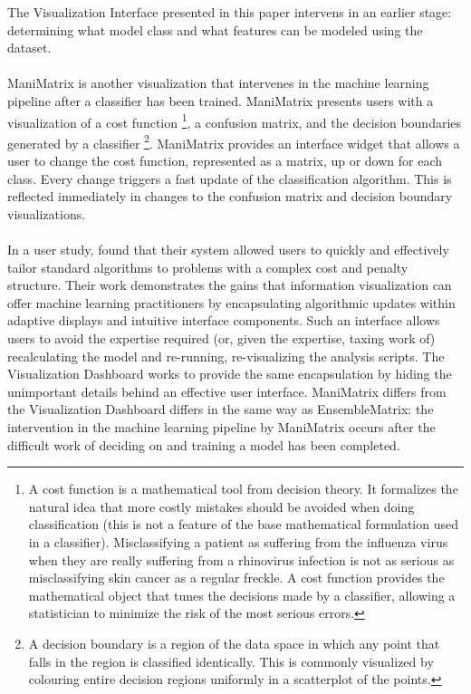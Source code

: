 \documentclass{sigchi}
\begin{document}
%
The Visualization Interface presented in this paper intervens in an earlier stage: determining what model class and what features can be modeled using the dataset. %
%
\\\\
%
ManiMatrix \cite{kapoor2010interactive} is another visualization that intervenes in the machine learning pipeline after a classifier has been trained. %
%
ManiMatrix presents users with a visualization of a cost function
%
\footnote{A cost function is a mathematical tool from decision theory. It formalizes the natural idea that more costly mistakes should be avoided when doing classification (this is not a feature of the base mathematical formulation used in a classifier). %
%
Misclassifying a patient as suffering from the influenza virus when they are really suffering from a rhinovirus infection is not as serious as misclassifying skin cancer as a regular freckle. %
%
A cost function provides the mathematical object that tunes the decisions made by a classifier, allowing a statistician to minimize the risk of the most serious errors.}, a confusion matrix, and the decision boundaries generated by a classifier%
%
\footnote{A decision boundary is a region of the data space in which any point that falls in the region is classified identically. This is commonly visualized by colouring entire decision regions uniformly in a scatterplot of the points.}. %
%
ManiMatrix provides an interface widget that allows a user to change the cost function, represented as a matrix, up or down for each class. %
%
Every change triggers a fast update of the classification algorithm. %
%
This is reflected immediately in changes to the confusion matrix and decision boundary visualizations. %
%
\\\\
%
In a user study, \cite{kapoor2010interactive} found that their system allowed users to quickly and effectively tailor standard algorithms to problems with a complex cost and penalty structure. %
%
Their work demonstrates the gains that information visualization can offer machine learning practitioners by encapsulating algorithmic updates within adaptive displays and intuitive interface components. %
%
Such an interface allows users to avoid the expertise required (or, given the expertise, taxing work of) recalculating the model and re-running, re-visualizing the analysis scripts. %
%
The Visualization Dashboard works to provide the same encapsulation by hiding the unimportant details behind an effective user interface. %
%
ManiMatrix differs from the Visualization Dashboard differs in the same way as EnsembleMatrix: the intervention in the machine learning pipeline by ManiMatrix occurs after the difficult work of deciding on and training a model has been completed.%
%
\end{document}
